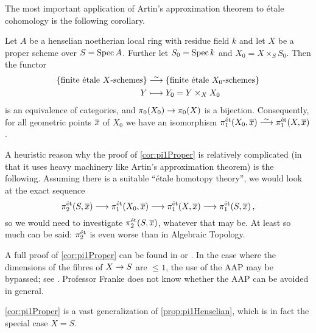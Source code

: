 The most important application of Artin's approximation theorem to étale cohomology is the following corollary.
\begin{cor}\label{cor:pi1Proper}
	Let $A$ be a henselian noetherian local ring with residue field $k$ and let $X$ be a proper scheme over $S=\operatorname{Spec} A$. Further let $S_0=\operatorname{Spec} k$ and $X_0=X\times_SS_0$. Then the functor
	\begin{align*}
		\left\{\text{finite étale $X$-schemes}\right\}&\isomorphism \left\{\text{finite étale $X_0$-schemes}\right\}\\
		Y&\longmapsto Y_0=Y\times_XX_0
	\end{align*}
	is an equivalence of categories, and $\pi_0(X_0)\morphism\pi_0(X)$ is a bijection. Consequently, for all geometric points $\ov{x}$ of $X_0$ we have an isomorphism $\pi_1^\et(X_0,\ov{x})\isomorphism\pi_1^\et(X,\ov{x})$.
\end{cor}
\begin{rem}
	\begin{alphanumerate}
		\item A heuristic reason why the proof of \cref{cor:pi1Proper} is relatively complicated (in that it uses heavy machinery like Artin's approximation theorem) is the following. Assuming there is a suitable \enquote{étale homotopy theory}, we would look at the exact sequence
		\begin{equation*}
		\pi_2^\et(S,\ov{x})\morphism\pi_1^\et(X_0,\ov{x})\morphism\pi_1^\et(X,\ov{x})\morphism\pi_1^\et(S,\ov{x})\,,
		\end{equation*}
		so we would need to investigate $\pi_2^\et(S,\ov{x})$, whatever that may be. At least so much can be said: $\pi_2^{\mathrm{\acute{e}t}}$ is even worse than in Algebraic Topology.
		\item A full proof of \cref{cor:pi1Proper} can be found in \cite[Arcata IV Prop.]{sga4.5} or \cite[]{stacks-project}. In the case where the dimensions of the fibres of $X\morphism S$ are $\leq 1$, the use of the AAP may be bypassed; see \cite[Exposé~XIII Prop.]{sga4.3}. Professor Franke does not know whether the AAP can be avoided in general.
		\item \cref{cor:pi1Proper} is a vast generalization of \cref{prop:pi1Henselian}, which is in fact the special case $X=S$.
	\end{alphanumerate}
\end{rem}
